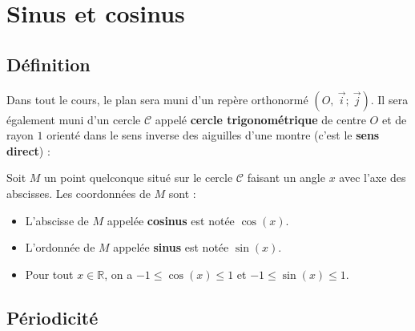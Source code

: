 






	\section{Sinus et cosinus}

	\subsection{Définition}

	Dans tout le cours, le plan sera muni d'un repère orthonormé $(O,\ \overrightarrow{i} ;\ \overrightarrow{j})$. Il sera également muni d'un cercle $\mathcal{C}$ appelé \textbf{cercle trigonométrique} de centre $O$ et de rayon $1$ orienté dans le sens inverse des aiguilles d'une montre (c'est le \textbf{sens direct}) :


	\begin{formula}
		Soit $M$ un point quelconque situé sur le cercle $\mathcal{C}$ faisant un angle $x$ avec l'axe des abscisses. Les coordonnées de $M$ sont :
		\begin{itemize}
			\item L'abscisse de $M$ appelée \textbf{cosinus} est notée $\cos(x)$.
			\item L'ordonnée de $M$ appelée \textbf{sinus} est notée $\sin(x)$.
			\item Pour tout $x \in \mathbb{R}$, on a $-1 \leq \cos(x) \leq 1$ et $-1 \leq \sin(x) \leq 1$.
		\end{itemize}
	\end{formula}

	\subsection{Périodicité}


